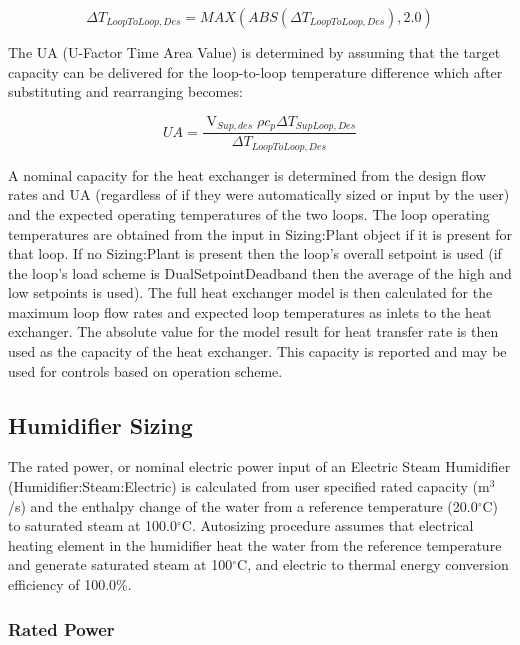 \begin{equation}
\Delta {T_{LoopToLoop,Des}} = MAX\left( {ABS\left( {\Delta {T_{LoopToLoop,Des}}} \right),2.0} \right)
\end{equation}

The UA (U-Factor Time Area Value) is determined by assuming that the target capacity can be delivered for the loop-to-loop temperature difference which after substituting and rearranging becomes:

\begin{equation}
UA = \frac{{{{\mathop {V}\limits }_{Sup,des}}\rho {c_p}\Delta {T_{SupLoop,Des}}}}{{\Delta {T_{LoopToLoop,Des}}}}
\end{equation}

A nominal capacity for the heat exchanger is determined from the design flow rates and UA (regardless of if they were automatically sized or input by the user) and the expected operating temperatures of the two loops. The loop operating temperatures are obtained from the input in Sizing:Plant object if it is present for that loop. If no Sizing:Plant is present then the loop's overall setpoint is used (if the loop's load scheme is DualSetpointDeadband then the average of the high and low setpoints is used). The full heat exchanger model is then calculated for the maximum loop flow rates and expected loop temperatures as inlets to the heat exchanger. The absolute value for the model result for heat transfer rate is then used as the capacity of the heat exchanger. This capacity is reported and may be used for controls based on operation scheme.

\subsection{Humidifier Sizing}\label{humidifier-sizing}

The rated power, or nominal electric power input of an Electric Steam Humidifier (Humidifier:Steam:Electric) is calculated from user specified rated capacity (m\(^{3}\)/s) and the enthalpy change of the water from a reference temperature (20.0\(^{\circ}\)C) to saturated steam at 100.0\(^{\circ}\)C. Autosizing procedure assumes that electrical heating element in the humidifier heat the water from the reference temperature and generate saturated steam at 100\(^{\circ}\)C, and electric to thermal energy conversion efficiency of 100.0\%.

\subsubsection{Rated Power}\label{rated-power}

